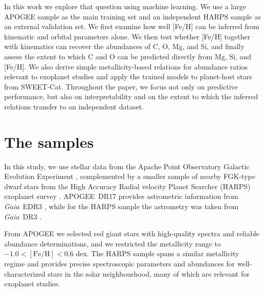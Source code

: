 \documentclass{aa}
\begin{document}
In this work we explore that question using machine learning. We use a large APOGEE sample as the main training set and an independent HARPS sample as an external validation set. We first examine how well [Fe/H] can be inferred from kinematic and orbital parameters alone. We then test whether [Fe/H] together with kinematics can recover the abundances of C, O, Mg, and Si, and finally assess the extent to which C and O can be predicted directly from Mg, Si, and [Fe/H]. We also derive simple metallicity-based relations for abundance ratios relevant to exoplanet studies and apply the trained models to planet-host stars from SWEET-Cat. Throughout the paper, we focus not only on predictive performance, but also on interpretability and on the extent to which the inferred relations transfer to an independent dataset.


\section{The samples}


In this study, we use stellar data from the Apache Point Observatory Galactic Evolution Experiment \citep[APOGEE;][]{Abdurrouf-22}, complemented by a smaller sample of nearby FGK-type dwarf stars from the High Accuracy Radial velocity Planet Searcher (HARPS) exoplanet survey \citep{Mayor-03, Adibekyan-12}. APOGEE~DR17 provides astrometric information from \textit{Gaia}~EDR3 \citep{Gaia-21}, while for the HARPS sample the astrometry was taken from \textit{Gaia}~DR3 \citep{Gaia-23}.

From APOGEE we selected red giant stars with high-quality spectra and reliable abundance determinations, and we restricted the metallicity range to $-1.0 < [\mathrm{Fe/H}] < 0.6$ dex. The HARPS sample spans a similar metallicity regime and provides precise spectroscopic parameters and abundances for well-characterized stars in the solar neighbourhood, many of which are relevant for exoplanet studies.
\end{document}
